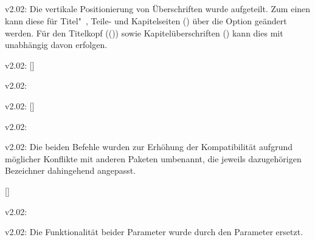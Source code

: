 \subsection{}
\begin{Cessation}{v2.02:}{}
\printobsoletelist%
%
Die vertikale Positionierung von Überschriften wurde aufgeteilt. Zum einen kann 
diese für Titel"~, Teile- und Kapitelseiten () über 
die Option  geändert werden. Für den Titelkopf
(()) sowie Kapitelüberschriften 
() kann dies mit  unabhängig 
davon erfolgen.
\end{Cessation}

\begin{Cessation}{v2.02:}{%
  []%
}
\begin{Cessation}{v2.02:}{}
\begin{Cessation}{v2.02:}{%
  []%
}
\begin{Cessation}{v2.02:}{}
\begin{Cessation}{v2.02:}{}
\printobsoletelist%
%
Die beiden Befehle wurden zur Erhöhung der Kompatibilität aufgrund möglicher 
Konflikte mit anderen Paketen umbenannt, die jeweils dazugehörigen Bezeichner 
dahingehend angepasst.
\end{Cessation}
\end{Cessation}
\end{Cessation}
\end{Cessation}
\end{Cessation}

\begin{Cessation}{}{[]}
\begin{Cessation}{v2.02:}{%
}
\begin{Cessation}{v2.02:}{%
}
\printobsoletelist%
%
Die Funktionalität beider Parameter wurde durch den Parameter 
 ersetzt.
\end{Cessation}
\end{Cessation}
\end{Cessation}



